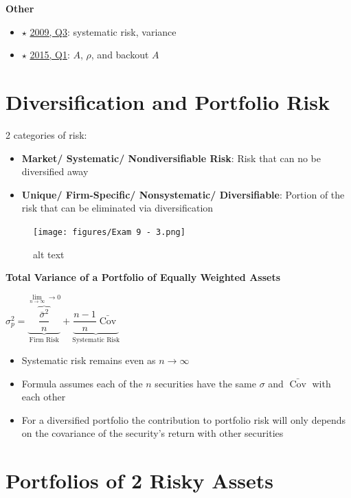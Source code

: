 \documentclass[]{book}
\providecommand{\tightlist}{%
  \setlength{\itemsep}{0pt}\setlength{\parskip}{0pt}}
\theoremstyle{definition}
\theoremstyle{definition}
\theoremstyle{remark}
\begin{document}
\textbf{Other}

\begin{itemize}
\tightlist
\item
  \(\star\) \protect\hyperlink{2009-3}{2009, Q3}: systematic risk,
  variance
\item
  \(\star\) \protect\hyperlink{2015-1}{2015, Q1}: \(A\), \(\rho\), and
  backout \(A\)
\end{itemize}

\section{Diversification and Portfolio
Risk}\label{diversification-and-portfolio-risk}

2 categories of risk:

\begin{itemize}
\item
  \textbf{Market/ Systematic/ Nondiversifiable Risk}: Risk that can no
  be diversified away
\item
  \textbf{Unique/ Firm-Specific/ Nonsystematic/ Diversifiable}: Portion
  of the risk that can be eliminated via diversification
\end{itemize}

\begin{figure}[htbp]
\centering
\texttt{[image: figures/Exam 9 - 3.png]}
\caption{alt text}
\end{figure}

\textbf{Total Variance of a Portfolio of Equally Weighted Assets}

\(\sigma^2_p = \underbrace{\overbrace{\dfrac{\bar{\sigma}^2}{n}}^{\lim \limits_{n \rightarrow \infty} \rightarrow 0}}_{\text{Firm Risk}} + \underbrace{\dfrac{n-1}{n}\bar{\operatorname{Cov}}}_{\text{Systematic Risk}}\)

\begin{itemize}
\item
  Systematic risk remains even as \(n \rightarrow \infty\)
\item
  Formula assumes each of the \(n\) securities have the same \(\sigma\)
  and \(\bar{\operatorname{Cov}}\) with each other
\item
  For a diversified portfolio the contribution to portfolio risk will
  only depends on the covariance of the security's return with other
  securities
\end{itemize}

\section{Portfolios of 2 Risky
Assets}\label{portfolios-of-2-risky-assets}
\end{document}
